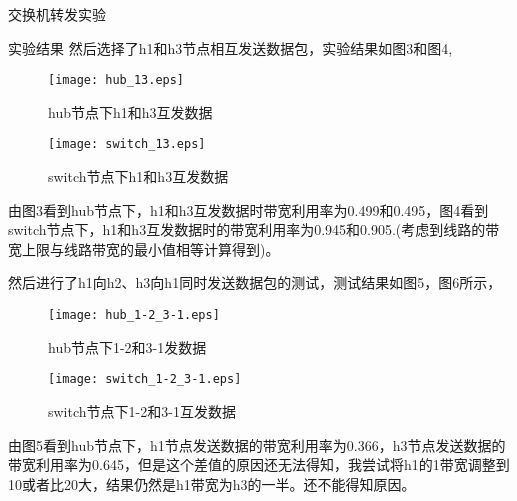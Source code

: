 \documentclass{article} %
\begin{document}
\begin{section}{交换机转发实验}
\begin{subsection}{实验结果}
		然后选择了h1和h3节点相互发送数据包，实验结果如图3和图4,
		\begin{figure}[hp]	
			\centering
			\texttt{[image: hub\_13.eps]}	
			\caption{hub节点下h1和h3互发数据}
		\end{figure}
		\begin{figure}[hp]	
			\centering
			\texttt{[image: switch\_13.eps]}	
			\caption{switch节点下h1和h3互发数据}
		\end{figure}
		由图3看到hub节点下，h1和h3互发数据时带宽利用率为0.499和0.495，图4看到switch节点下，h1和h3互发数据时的带宽利用率为0.945和0.905.(考虑到线路的带宽上限与线路带宽的最小值相等计算得到)。\vspace{3pt}
		
		然后进行了h1向h2、h3向h1同时发送数据包的测试，测试结果如图5，图6所示，
		\begin{figure}[hp]	
			\centering
			\texttt{[image: hub\_1-2\_3-1.eps]}	
			\caption{hub节点下1-2和3-1发数据}
		\end{figure}
		\begin{figure}[hp]	
			\centering
			\texttt{[image: switch\_1-2\_3-1.eps]}	
			\caption{switch节点下1-2和3-1互发数据}
		\end{figure}
		由图5看到hub节点下，h1节点发送数据的带宽利用率为0.366，h3节点发送数据的带宽利用率为0.645，但是这个差值的原因还无法得知，我尝试将h1的1带宽调整到10或者比20大，结果仍然是h1带宽为h3的一半。还不能得知原因。\vspace{3pt}
		

\end{subsection}
\end{section}
\end{document}
